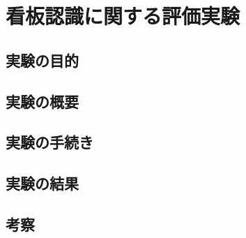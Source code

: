 \chapter{看板認識に関する評価実験}

\section{実験の目的}

\section{実験の概要}

\section{実験の手続き}

\section{実験の結果}

\section{考察}